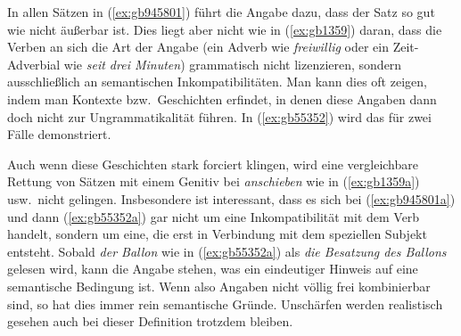 \begin{exe}
  \ex\label{ex:gb945801}
  \begin{xlist}
  \end{xlist}
\end{exe}

In allen Sätzen in (\ref{ex:gb945801}) führt die Angabe dazu, dass der Satz so gut wie nicht äußerbar ist.
Dies liegt aber nicht wie in (\ref{ex:gb1359}) daran, dass die Verben an sich die Art der Angabe (\zB ein Adverb wie \textit{freiwillig} oder ein Zeit-Adverbial wie \textit{seit drei Minuten}) grammatisch nicht lizenzieren, sondern ausschließlich an semantischen Inkompatibilitäten.
Man kann dies oft zeigen, indem man Kontexte bzw.\ Geschichten erfindet, in denen diese Angaben dann doch nicht zur Ungrammatikalität führen.
In (\ref{ex:gb55352}) wird das für zwei Fälle demonstriert.

\begin{exe}
  \ex\label{ex:gb55352}
  \begin{xlist}
  \end{xlist}
\end{exe}

Auch wenn diese Geschichten stark forciert klingen, wird eine vergleichbare Rettung von Sätzen mit einem Genitiv bei \textit{anschieben} wie in (\ref{ex:gb1359a}) usw.\ nicht gelingen.
Insbesondere ist interessant, dass es sich bei (\ref{ex:gb945801a}) und dann (\ref{ex:gb55352a}) gar nicht um eine Inkompatibilität mit dem Verb handelt, sondern um eine, die erst in Verbindung mit dem speziellen Subjekt entsteht.
Sobald \textit{der Ballon} wie in (\ref{ex:gb55352a}) als \textit{die Besatzung des Ballons} gelesen wird, kann die Angabe stehen, was ein eindeutiger Hinweis auf eine semantische Bedingung ist.
Wenn also Angaben nicht völlig frei kombinierbar sind, so hat dies immer rein semantische Gründe.
Unschärfen werden realistisch gesehen auch bei dieser Definition trotzdem bleiben.

